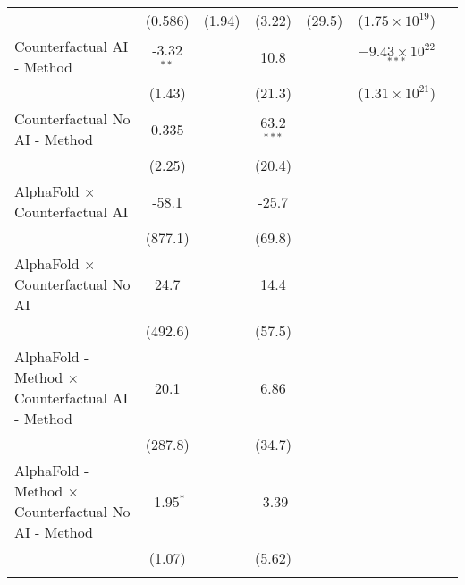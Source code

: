 \begin{tabular}{lcccccc}
                                                              & (0.586)      & (1.94)       & (3.22)       & (29.5)       & ($1.75\times 10^{19}$)         &   \\   
   Counterfactual AI - Method                                 & -3.32$^{**}$ &              & 10.8         &              & $-9.43\times 10^{22}$$^{***}$  &   \\   
                                                              & (1.43)       &              & (21.3)       &              & ($1.31\times 10^{21}$)         &   \\   
   Counterfactual No AI - Method                              & 0.335        &              & 63.2$^{***}$ &              &                                &   \\   
                                                              & (2.25)       &              & (20.4)       &              &                                &   \\   
   AlphaFold $\times$ Counterfactual AI                       & -58.1        &              & -25.7        &              &                                &   \\   
                                                              & (877.1)      &              & (69.8)       &              &                                &   \\   
   AlphaFold $\times$ Counterfactual No AI                    & 24.7         &              & 14.4         &              &                                &   \\   
                                                              & (492.6)      &              & (57.5)       &              &                                &   \\   
   AlphaFold - Method $\times$ Counterfactual AI - Method     & 20.1         &              & 6.86         &              &                                &   \\   
                                                              & (287.8)      &              & (34.7)       &              &                                &   \\   
   AlphaFold - Method $\times$ Counterfactual No AI - Method  & -1.95$^{*}$  &              & -3.39        &              &                                &   \\   
                                                              & (1.07)       &              & (5.62)       &              &                                &   \\   
$$
\end{tabular}
